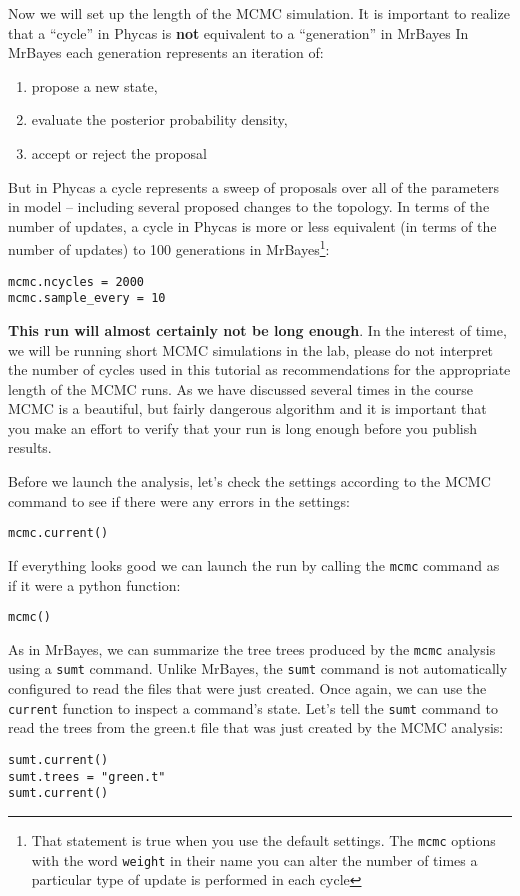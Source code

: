 \documentclass{article}
\newcommand{\cmd}[1]{\texttt{#1}\xspace}
\newcommand{\mb}{MrBayes\xspace}
\newcommand{\phycas}{Phycas\xspace}
\newcommand{\localfile}[1]{\textsf{#1}\xspace}
\begin{document}
Now we will set up the length of the MCMC simulation. 
It is important to realize that a ``cycle'' in \phycas is {\bf not}
equivalent to a ``generation'' in \mb \citet{RonquistH2003}
In \mb each generation represents an iteration of:
\begin{enumerate}
	\item propose a new state,
	\item evaluate the posterior probability density,
	\item accept or reject the proposal
\end{enumerate}
But in \phycas a cycle represents a sweep of proposals over all of the parameters
in model -- including several proposed changes to the topology.
In terms of the number of updates, a cycle in \phycas is more or less equivalent (in terms 
of the number of updates) to 100 generations in \mb\footnote{That statement is true when you use the default settings. 
The \cmd{mcmc} options with the word \cmd{weight} in their name
you can alter the number of times a particular type of update is performed
in each cycle}:
\begin{verbatim}
mcmc.ncycles = 2000
mcmc.sample_every = 10
\end{verbatim}
{\bf This run will almost certainly not be long enough}.
In the interest of time, we will be running short MCMC simulations in the lab, please do
not interpret the number of cycles used in this tutorial 
as recommendations for the appropriate length of the MCMC runs.
As we have discussed several times in the course MCMC is a beautiful, but
fairly dangerous algorithm and it is important that you make an 
effort to verify that your run is long enough before you publish
results.


Before we launch the analysis, let's check the settings according to the MCMC command
to see if there were any errors in the settings:
\begin{verbatim}
mcmc.current()
\end{verbatim}

If everything looks good we can launch the run by calling the \cmd{mcmc} command
as if it were a python function:
\begin{verbatim}
mcmc()
\end{verbatim}

As in \mb, we can summarize the tree trees produced by the \cmd{mcmc} analysis
using a \cmd{sumt} command.
Unlike \mb, the \cmd{sumt} command is not automatically configured to read the files
that were just created.
Once again, we can use the \cmd{current} function to inspect a command's state.
Let's tell the \cmd{sumt} command to read the trees from the \localfile{green.t} file
that was just created by the MCMC analysis:
\begin{verbatim}
sumt.current()
sumt.trees = "green.t"
sumt.current()
\end{verbatim}
\end{document}
